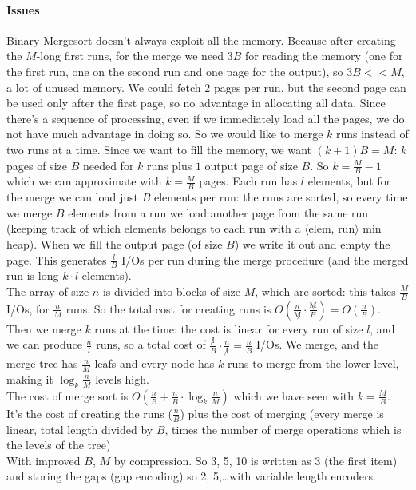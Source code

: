 \documentclass[10pt]{report}
\begin{document}
\paragraph{Issues} Binary Mergesort doesn't always exploit all the memory. Because after creating the $M$-long first runs, for the merge we need $3B$ for reading the memory (one for the first run, one on the second run and one page for the output), so $3B << M$, a lot of unused memory. We could fetch 2 pages per run, but the second page can be used only after the first page, so no advantage in allocating all data. Since there's a sequence of processing, even if we immediately load all the pages, we do not have much advantage in doing so. So we would like to merge $k$ runs instead of two runs at a time. Since we want to fill the memory, we want $(k+1)B = M$: $k$ pages of size $B$ needed for $k$ runs plus $1$ output page of size $B$. So $k = \frac{M}{B} - 1$ which we can approximate with $k = \frac{M}{B}$ pages. Each run has $l$ elements, but for the merge we can load just $B$ elements per run: the runs are sorted, so every time we merge $B$ elements from a run we load another page from the same run (keeping track of which elements belongs to each run with a $\langle$elem, run$\rangle$ min heap). When we fill the output page (of size $B$) we write it out and empty the page. This generates $\frac{l}{B}$ I/Os per run during the merge procedure (and the merged run is long $k\cdot l$ elements).\\
The array of size $n$ is divided into blocks of size $M$, which are sorted: this takes $\frac{M}{B}$ I/Os, for $\frac{n}{M}$ runs. So the total cost for creating runs is $O(\frac{n}{\not M} \cdot \frac{\not M}{B}) = O(\frac{n}{B})$. Then we merge $k$ runs at the time: the cost is linear for every run of size $l$, and we can produce $\frac{n}{l}$ runs, so a total cost of $\frac{\not l}{B}\cdot\frac{n}{\not l} = \frac{n}{B}$ I/Os. We merge, and the merge tree has $\frac{n}{M}$ leafs and every node has $k$ runs to merge from the lower level, making it $\log_k \frac{n}{M}$ levels high.\\
The cost of merge sort is $O(\frac{n}{B} + \frac{n}{B}\cdot\log_k \frac{n}{M})$ which we have seen with $k = \frac{M}{B}$. It's the cost of creating the runs ($\frac{n}{B}$) plus the cost of merging (every merge is linear, total length divided by $B$, times the number of merge operations which is the levels of the tree)\\
With improved $B$, $M$ by compression. So 3, 5, 10 is written as 3 (the first item) and storing the gaps (gap encoding) so 2, 5,\ldots with variable length encoders.\\\\
\end{document}
